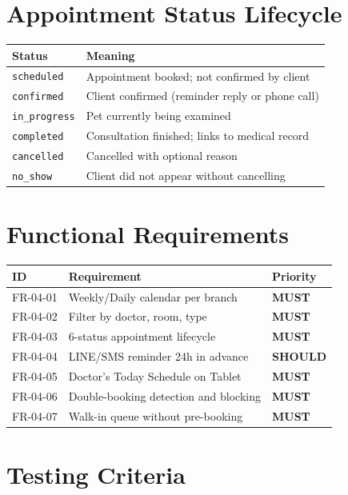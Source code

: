 \documentclass[12pt,a4paper]{report}
\newcommand{\must}{\colorbox{red!15}{\color{errorred}\textbf{\small MUST}}}
\newcommand{\should}{\colorbox{orange!15}{\color{warnorange}\textbf{\small SHOULD}}}
\begin{document}
\section{Appointment Status Lifecycle}

\begin{longtable}{L{3.5cm} L{10.5cm}}
\toprule
\textbf{Status} & \textbf{Meaning} \\\midrule\endhead\bottomrule\endfoot
\texttt{scheduled}    & Appointment booked; not confirmed by client \\
\texttt{confirmed}    & Client confirmed (reminder reply or phone call) \\
\texttt{in\_progress} & Pet currently being examined \\
\texttt{completed}    & Consultation finished; links to medical record \\
\texttt{cancelled}    & Cancelled with optional reason \\
\texttt{no\_show}     & Client did not appear without cancelling \\
\end{longtable}

\section{Functional Requirements}

\begin{longtable}{L{2.5cm} L{9cm} C{2cm}}
\toprule
\textbf{ID} & \textbf{Requirement} & \textbf{Priority} \\\midrule\endhead\bottomrule\endfoot
FR-04-01 & Weekly/Daily calendar per branch & \must \\
FR-04-02 & Filter by doctor, room, type & \must \\
FR-04-03 & 6-status appointment lifecycle & \must \\
FR-04-04 & LINE/SMS reminder 24h in advance & \should \\
FR-04-05 & Doctor's Today Schedule on Tablet & \must \\
FR-04-06 & Double-booking detection and blocking & \must \\
FR-04-07 & Walk-in queue without pre-booking & \must \\
\end{longtable}

\section{Testing Criteria}
\end{document}
